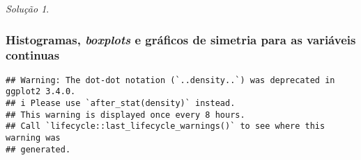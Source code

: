 \documentclass[
]{latex/krantz}
\newenvironment{Shaded}{\begin{snugshade}}{\end{snugshade}}
\newcommand{\AttributeTok}[1]{\textcolor[rgb]{0.13,0.29,0.53}{#1}}
\newcommand{\ConstantTok}[1]{\textcolor[rgb]{0.56,0.35,0.01}{#1}}
\newcommand{\DecValTok}[1]{\textcolor[rgb]{0.00,0.00,0.81}{#1}}
\newcommand{\FunctionTok}[1]{\textcolor[rgb]{0.13,0.29,0.53}{\textbf{#1}}}
\newcommand{\NormalTok}[1]{#1}
\newcommand{\SpecialCharTok}[1]{\textcolor[rgb]{0.81,0.36,0.00}{\textbf{#1}}}
\newcommand{\StringTok}[1]{\textcolor[rgb]{0.31,0.60,0.02}{#1}}
\theoremstyle{definition}
\theoremstyle{definition}
\theoremstyle{definition}
\theoremstyle{definition}
\theoremstyle{remark}
\newtheorem*{solution}{Solução}
\begin{document}
\begin{solution}
\hypertarget{histogramas-boxplots-e-gruxe1ficos-de-simetria-para-as-variuxe1veis-continuas}{%
\subsubsection*{\texorpdfstring{Histogramas, \emph{boxplots} e gráficos de simetria para as variáveis continuas}{Histogramas, boxplots e gráficos de simetria para as variáveis continuas}}\label{histogramas-boxplots-e-gruxe1ficos-de-simetria-para-as-variuxe1veis-continuas}}

\begin{Shaded}
\end{Shaded}

\begin{verbatim}
## Warning: The dot-dot notation (`..density..`) was deprecated in ggplot2 3.4.0.
## i Please use `after_stat(density)` instead.
## This warning is displayed once every 8 hours.
## Call `lifecycle::last_lifecycle_warnings()` to see where this warning was
## generated.
\end{verbatim}


\end{solution}
\end{document}
